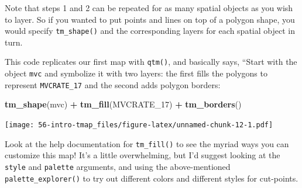 \documentclass[
]{book}
\newenvironment{Shaded}{\begin{snugshade}}{\end{snugshade}}
\newcommand{\FunctionTok}[1]{\textcolor[rgb]{0.13,0.29,0.53}{\textbf{#1}}}
\newcommand{\NormalTok}[1]{#1}
\newcommand{\SpecialCharTok}[1]{\textcolor[rgb]{0.81,0.36,0.00}{\textbf{#1}}}
\newcommand{\StringTok}[1]{\textcolor[rgb]{0.31,0.60,0.02}{#1}}
\begin{document}
Note that steps 1 and 2 can be repeated for as many spatial objects as you wish to layer. So if you wanted to put points and lines on top of a polygon shape, you would specify \texttt{tm\_shape()} and the corresponding layers for each spatial object in turn.

This code replicates our first map with \texttt{qtm()}, and basically says, ``Start with the object \texttt{mvc} and symbolize it with two layers: the first fills the polygons to represent \texttt{MVCRATE\_17} and the second adds polygon borders:

\begin{Shaded}
\begin{Highlighting}[]
\FunctionTok{tm\_shape}\NormalTok{(mvc) }\SpecialCharTok{+}
  \FunctionTok{tm\_fill}\NormalTok{(}\StringTok{\textquotesingle{}MVCRATE\_17\textquotesingle{}}\NormalTok{) }\SpecialCharTok{+}
  \FunctionTok{tm\_borders}\NormalTok{()}
\end{Highlighting}
\end{Shaded}

\texttt{[image: 56-intro-tmap\_files/figure-latex/unnamed-chunk-12-1.pdf]}

Look at the help documentation for \texttt{tm\_fill()} to see the myriad ways you can customize this map! It's a little overwhelming, but I'd suggest looking at the \texttt{style} and \texttt{palette} arguments, and using the above-mentioned \texttt{palette\_explorer()} to try out different colors and different styles for cut-points.
\end{document}
